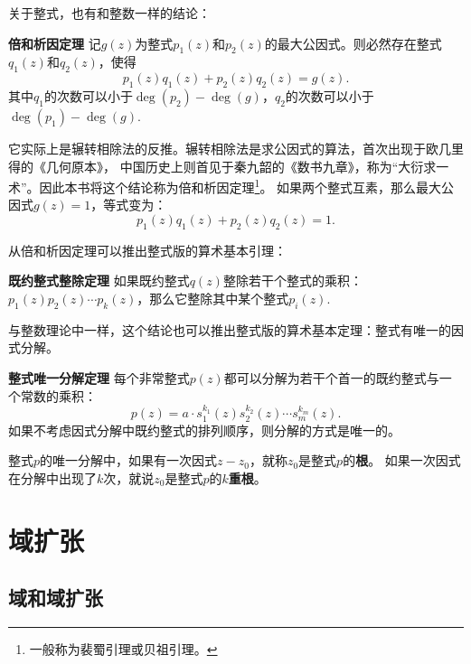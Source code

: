 \documentclass[12pt,UTF8]{ctexbook}
\begin{document}
\begin{appendix}
关于整式，也有和整数一样的结论：
\begin{pp}{\bfseries 倍和析因定理}\label{pp:0_1}
    记$g(z)$为整式$p_1(z)$和$p_2(z)$的最大公因式。则必然存在整式$q_1(z)$和$q_2(z)$，使得
    $$ p_1(z) q_1(z) + p_2(z) q_2(z) = g(z).$$
    其中$q_1$的次数可以小于$\deg(p_2) - \deg(g)$，$q_2$的次数可以小于$\deg(p_1) - \deg(g)$.
\end{pp} 
它实际上是辗转相除法的反推。辗转相除法是求公因式的算法，首次出现于欧几里得的《几何原本》，
中国历史上则首见于秦九韶的《数书九章》，称为“大衍求一术”。因此本书将这个结论称为倍和析因定理\footnote{一般称为裴蜀引理或贝祖引理。}。
如果两个整式互素，那么最大公因式$g(z)=1$，等式变为：
$$ p_1(z) q_1(z) + p_2(z) q_2(z) = 1.$$

从倍和析因定理可以推出整式版的算术基本引理：
\begin{pp}{\bfseries 既约整式整除定理}\label{pp:0_2}
    如果既约整式$q(z)$整除若干个整式的乘积：$p_1(z)p_2(z)\cdots p_k(z)$，那么它整除其中某个整式$p_i(z)$.
\end{pp} 
与整数理论中一样，这个结论也可以推出整式版的算术基本定理：整式有唯一的因式分解。
\begin{pp}{\bfseries 整式唯一分解定理}\label{pp:0_3}
    每个非常整式$p(z)$都可以分解为若干个首一的既约整式与一个常数的乘积：
    $$ p(z) = a\cdot s_1^{k_1}(z)s_2^{k_2}(z)\cdots s_m^{k_m}(z). $$
    如果不考虑因式分解中既约整式的排列顺序，则分解的方式是唯一的。
\end{pp} 

整式$p$的唯一分解中，如果有一次因式$z - z_0$，就称$z_0$是整式$p$的\textbf{根}。
如果一次因式在分解中出现了$k$次，就说$z_0$是整式$p$的$k$\textbf{重根}。

\chapter{域扩张}

\section{域和域扩张}

\end{appendix}
\end{document}
